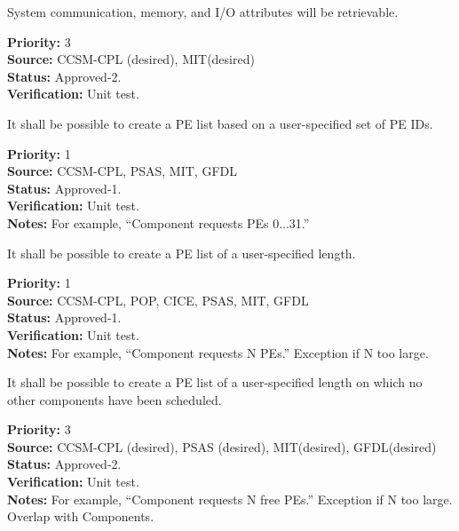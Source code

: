 System communication, memory, and I/O attributes will be retrievable.
\begin{reqlist}
{\bf Priority:} 3 \\
{\bf Source:}  CCSM-CPL (desired), MIT(desired) \\
{\bf Status:} Approved-2. \\
{\bf Verification:} Unit test.
\end{reqlist}



It shall be possible to create a PE list based on a user-specified set
of PE IDs.

\begin{reqlist}
{\bf Priority:} 1\\
{\bf Source:}  CCSM-CPL, PSAS, MIT, GFDL \\
{\bf Status:} Approved-1. \\
{\bf Verification:} Unit test. \\ 
{\bf Notes:}  For example, ``Component requests PEs 0...31.''
\end{reqlist}

It shall be possible to create a PE list of a user-specified length.

\begin{reqlist}
{\bf Priority:} 1 \\
{\bf Source:}  CCSM-CPL, POP, CICE, PSAS, MIT, GFDL \\
{\bf Status:} Approved-1. \\
{\bf Verification:} Unit test.\\ 
{\bf Notes:}  For example, ``Component requests N PEs.'' Exception if N too
  large.
\end{reqlist}

It shall be possible to create a PE list of a user-specified length
on which no other components have been scheduled.

\begin{reqlist}
  {\bf Priority:} 3 \\
  {\bf Source:}  CCSM-CPL (desired), PSAS (desired), MIT(desired), GFDL(desired)  \\
  {\bf Status:} Approved-2. \\
  {\bf Verification:} Unit test.\\
  {\bf Notes:} For example, ``Component requests N free PEs.''
  Exception if N too large.  Overlap with Components.
\end{reqlist}

